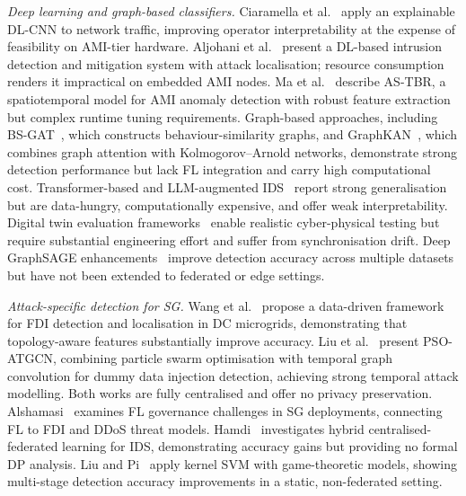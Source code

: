 \documentclass[sensors,article,submit,pdftex,moreauthors]{Definitions/mdpi}
\begin{document}
\noindent\textit{Deep learning and graph-based classifiers.} Ciaramella et al.~\cite{Ciaramella2025} apply an explainable DL-CNN to network traffic, improving operator interpretability at the expense of feasibility on AMI-tier hardware. Aljohani et al.~\cite{Aljohani2024} present a DL-based intrusion detection and mitigation system with attack localisation; resource consumption renders it impractical on embedded AMI nodes. Ma et al.~\cite{Ma2025} describe AS-TBR, a spatiotemporal model for AMI anomaly detection with robust feature extraction but complex runtime tuning requirements. Graph-based approaches, including BS-GAT~\cite{Wang2025}, which constructs behaviour-similarity graphs, and GraphKAN~\cite{Wu2025}, which combines graph attention with Kolmogorov--Arnold networks, demonstrate strong detection performance but lack FL integration and carry high computational cost. Transformer-based and LLM-augmented IDS~\cite{Transformers2024} report strong generalisation but are data-hungry, computationally expensive, and offer weak interpretability. Digital twin evaluation frameworks~\cite{DigitalTwin2024} enable realistic cyber-physical testing but require substantial engineering effort and suffer from synchronisation drift. Deep GraphSAGE enhancements~\cite{GraphSAGE2025} improve detection accuracy across multiple datasets but have not been extended to federated or edge settings.

\noindent\textit{Attack-specific detection for SG.} Wang et al.~\cite{fdla_dc_microgrids} propose a data-driven framework for FDI detection and localisation in DC microgrids, demonstrating that topology-aware features substantially improve accuracy. Liu et al.~\cite{pso_atgcn} present PSO-ATGCN, combining particle swarm optimisation with temporal graph convolution for dummy data injection detection, achieving strong temporal attack modelling. Both works are fully centralised and offer no privacy preservation. Alshamasi~\cite{Alshamasi2025} examines FL governance challenges in SG deployments, connecting FL to FDI and DDoS threat models. Hamdi~\cite{hamdi2025hybrid} investigates hybrid centralised-federated learning for IDS, demonstrating accuracy gains but providing no formal DP analysis. Liu and Pi~\cite{liu2017kernel} apply kernel SVM with game-theoretic models, showing multi-stage detection accuracy improvements in a static, non-federated setting.
\end{document}
